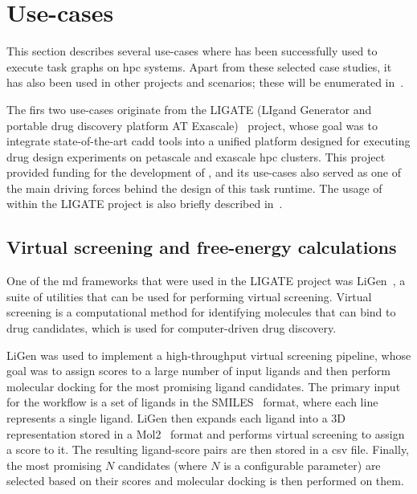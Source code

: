 
\section{Use-cases}
This section describes several use-cases where \hyperqueue{} has been successfully used
to execute task graphs on \gls{hpc} systems. Apart from these selected case studies,
it has also been used in other projects and scenarios; these will be enumerated
in~.

The firs two use-cases originate from the LIGATE (LIgand Generator and portable drug discovery
platform AT Exascale)~\cite{ligate} project, whose goal was to integrate state-of-the-art
\gls{cadd} tools into a unified platform designed for executing drug design
experiments on petascale and exascale \gls{hpc} clusters. This project provided
funding for the development of \hyperqueue{}, and its use-cases also served as one of the
main driving forces behind the design of this task runtime. The usage of \hyperqueue{}
within the LIGATE project is also briefly described in~\cite{ligate}.

\subsection{Virtual screening and free-energy calculations}
\label{sec:hq-usecase-ligen}
One of the \gls{md} frameworks that were used in the LIGATE project was
LiGen~\cite{ligen,ligen_exscalate}, a suite of utilities that can be used for performing virtual
screening. Virtual screening is a computational method for identifying molecules that can bind to
drug candidates, which is used for computer-driven drug discovery.

LiGen was used to implement a high-throughput virtual screening pipeline, whose goal was to assign
scores to a large number of input ligands and then perform molecular docking for the most promising
ligand candidates. The primary input for the workflow is a set of ligands in the
SMILES~\cite{smiles} format, where each line represents a single ligand. LiGen then
expands each ligand into a 3D representation stored in a Mol2~\cite{mol2} format and
performs virtual screening to assign a score to it. The resulting ligand-score pairs are then
stored in a \gls{csv} file. Finally, the most promising $N$
candidates (where $N$ is a configurable parameter) are selected based on their
scores and molecular docking is then performed on them.

